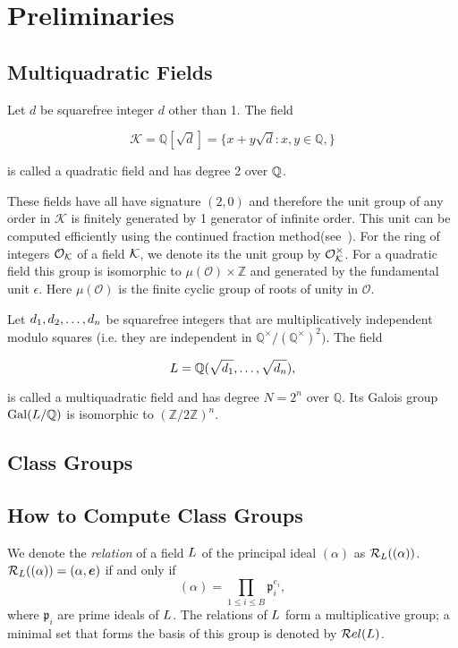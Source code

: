 \section{Preliminaries}
\label{sec:prelims}

\subsection{Multiquadratic Fields}
\begin{mydef}
Let $d$ be squarefree integer $d$ other than 1.
The field

\[\mathcal{K} = \mathbb{Q}[\sqrt{d}] = \{x + y\sqrt{d}: x,y \in \mathbb{Q},\}\]

is called a quadratic field and has degree 2 over $\mathbb{Q}$.
\end{mydef}

These fields have all have signature $(2,0)$ and therefore the
unit group of any order in $\mathcal{K}$ is finitely generated
by 1 generator of infinite order.
This unit can be computed efficiently using the continued fraction method(see~\cite{Cohen:1995:CCA:206777}).
For the ring of integers $\mathcal{O}_{\mathcal{K}}$ of a field $\mathcal{K}$,
we denote its the unit group by $\mathcal{O}^\times_{\mathcal{K}}$.
For a quadratic field this group is isomorphic to $\mu(\mathcal{O})\times\mathbb{Z}$
and generated by the fundamental unit $\epsilon$.
Here $\mu(\mathcal{O})$ is the finite cyclic group of roots of unity in
$\mathcal{O}$.

\begin{mydef}
Let $d_{1}, d_{2}, \dots, d_{n}$ be squarefree integers that are multiplicatively
independent modulo squares (i.e. they are independent in $\mathbb{Q}^\times/
(\mathbb{Q}^\times)^2)$.
The field

\[L = \mathbb{Q}(\sqrt{d_{1}},\ldots,\sqrt{d_{n}}) ,\]

is called a multiquadratic field and has degree $N = 2^n$ over $\mathbb{Q}$.
Its Galois group ${\rm Gal}(L\slash\mathbb{Q})$ is isomorphic to $(\mathbb{Z}/2\mathbb{Z})^n$.
\end{mydef}


\subsection{Class Groups}
\subsection{How to Compute Class Groups}
\begin{mydef}[relations]
We denote the \textit{relation} of a field $L$ 
of the principal ideal $(\alpha)$ as $\mathcal{R}_{L}((\alpha))$.
$\rel \LL {(\alpha)} = (\alpha, \vec e)$ if and only if 
$$
(\alpha) = \prod_{1\leq i \leq B} \mathfrak{p}_i^{e_i},
$$
where $\mathfrak{p}_i$ are prime ideals of $L$.
The relations of $L$ form a multiplicative group;
a minimal set that forms the basis of this group is denoted by $\mathcal{R}el(L)$.
\end{mydef}
